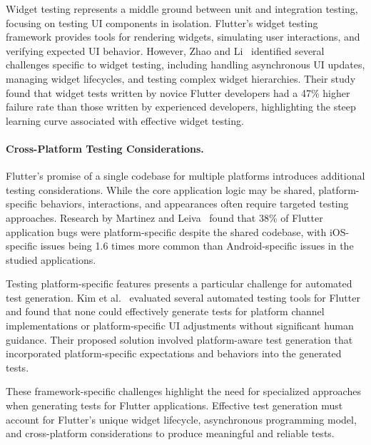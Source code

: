 \hspace{0.5cm} Widget testing represents a middle ground between unit and integration testing, focusing on testing UI components in isolation. Flutter's widget testing framework provides tools for rendering widgets, simulating user interactions, and verifying expected UI behavior. However, Zhao and Li~\cite{WidgetTestChallenges} identified several challenges specific to widget testing, including handling asynchronous UI updates, managing widget lifecycles, and testing complex widget hierarchies. Their study found that widget tests written by novice Flutter developers had a 47\% higher failure rate than those written by experienced developers, highlighting the steep learning curve associated with effective widget testing.

\paragraph{Cross-Platform Testing Considerations.} Flutter's promise of a single codebase for multiple platforms introduces additional testing considerations. While the core application logic may be shared, platform-specific behaviors, interactions, and appearances often require targeted testing approaches. Research by Martinez and Leiva~\cite{CrossPlatformTesting} found that 38\% of Flutter application bugs were platform-specific despite the shared codebase, with iOS-specific issues being 1.6 times more common than Android-specific issues in the studied applications.

\hspace{0.5cm} Testing platform-specific features presents a particular challenge for automated test generation. Kim et al.~\cite{PlatformSpecificTesting} evaluated several automated testing tools for Flutter and found that none could effectively generate tests for platform channel implementations or platform-specific UI adjustments without significant human guidance. Their proposed solution involved platform-aware test generation that incorporated platform-specific expectations and behaviors into the generated tests.

\hspace{0.5cm} These framework-specific challenges highlight the need for specialized approaches when generating tests for Flutter applications. Effective test generation must account for Flutter's unique widget lifecycle, asynchronous programming model, and cross-platform considerations to produce meaningful and reliable tests.

